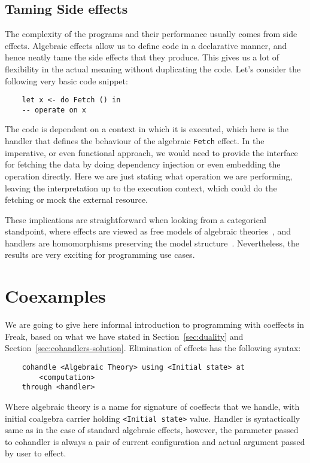 \documentclass[declaration,shortabstract]{iithesis}
\theoremstyle{definition} \newtheorem{definition}{Definition}[chapter]
\theoremstyle{remark} \newtheorem{remark}[definition]{Observation}
\theoremstyle{plain} \newtheorem{theorem}[definition]{Theorem}
\theoremstyle{plain} \newtheorem{lemma}[definition]{Lemma}
\begin{document}
    \subsection{Taming Side effects}

    The complexity of the programs and their performance usually comes from side effects.
    Algebraic effects allow us to define code in a declarative manner, and hence
    neatly tame the side effects that they produce. This gives us a lot of flexibility
    in the actual meaning without duplicating the code. Let's consider the following
    very basic code snippet:

\begin{verbatim}
    let x <- do Fetch () in
    -- operate on x
\end{verbatim}

    The code is dependent on a context in which it is executed, which here is
    the handler that defines the behaviour of the algebraic \verb!Fetch! effect.
    In the imperative, or even functional approach, we would need to provide
    the interface for fetching the data by doing dependency injection or even
    embedding the operation directly. Here we are just stating what operation
    we are performing, leaving the interpretation up to the execution context,
    which could do the fetching or mock the external resource.

    These implications are straightforward when looking from a categorical standpoint,
    where effects are viewed as free models of algebraic theories~\cite{adequacy},
    and handlers are homomorphisms preserving the model structure~\cite{handlers}.
    Nevertheless, the results are very exciting for programming use cases.

\section{Coexamples}\label{sec:coexamples}

    We are going to give here informal introduction to programming with
    coeffects in Freak, based on what we have stated in
    Section~\ref{sec:duality} and Section~\ref{sec:cohandlers-solution}.
    Elimination of effects has the following syntax:

\begin{verbatim}
    cohandle <Algebraic Theory> using <Initial state> at
        <computation>
    through <handler>
\end{verbatim}

    Where algebraic theory is a name for signature of coeffects that we
    handle, with initial coalgebra carrier holding \verb!<Initial state>! value.
    Handler is syntactically same as in the case of standard algebraic effects,
    however, the parameter passed to cohandler is always a pair of
    current configuration and actual argument passed by user to effect.
\end{document}
